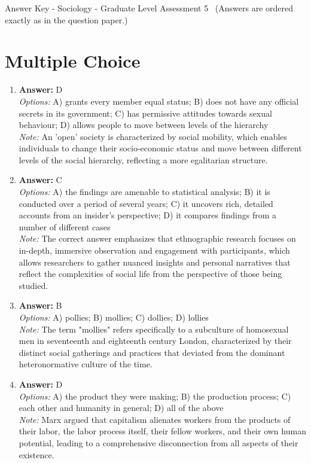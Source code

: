 \documentclass[12pt]{article}
\begin{document}
\begin{center}
Answer Key - Sociology - Graduate Level Assessment 5 \
\small (Answers are ordered exactly as in the question paper.)
\end{center}

\section*{Multiple Choice}
\begin{enumerate}[label=\arabic*.]
\item \textbf{Answer:} D
\\ \textit{Options:} A) grants every member equal status; B) does not have any official secrets in its government; C) has permissive attitudes towards sexual behaviour; D) allows people to move between levels of the hierarchy
\\ \textit{Note:} An 'open' society is characterized by social mobility, which enables individuals to change their socio-economic status and move between different levels of the social hierarchy, reflecting a more egalitarian structure.
\item \textbf{Answer:} C
\\ \textit{Options:} A) the findings are amenable to statistical analysis; B) it is conducted over a period of several years; C) it uncovers rich, detailed accounts from an insider's perspective; D) it compares findings from a number of different cases
\\ \textit{Note:} The correct answer emphasizes that ethnographic research focuses on in-depth, immersive observation and engagement with participants, which allows researchers to gather nuanced insights and personal narratives that reflect the complexities of social life from the perspective of those being studied.
\item \textbf{Answer:} B
\\ \textit{Options:} A) pollies; B) mollies; C) dollies; D) lollies
\\ \textit{Note:} The term "mollies" refers specifically to a subculture of homosexual men in seventeenth and eighteenth century London, characterized by their distinct social gatherings and practices that deviated from the dominant heteronormative culture of the time.
\item \textbf{Answer:} D
\\ \textit{Options:} A) the product they were making; B) the production process; C) each other and humanity in general; D) all of the above
\\ \textit{Note:} Marx argued that capitalism alienates workers from the products of their labor, the labor process itself, their fellow workers, and their own human potential, leading to a comprehensive disconnection from all aspects of their existence.

\end{enumerate}
\end{document}
